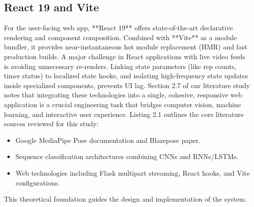 \subsection{React 19 and Vite}
For the user-facing web app, **React 19** offers state-of-the-art declarative rendering and component composition. Combined with **Vite** as a module bundler, it provides near-instantaneous hot module replacement (HMR) and fast production builds. A major challenge in React applications with live video feeds is avoiding unnecessary re-renders. Linking state parameters (like rep counts, timer status) to localized state hooks, and isolating high-frequency state updates inside specialized components, prevents UI lag.
Section 2.7 of our literature study notes that integrating these technologies into a single, cohesive, responsive web application is a crucial engineering task that bridges computer vision, machine learning, and interactive user experience.
Listing 2.1 outlines the core literature sources reviewed for this study:
\begin{itemize}
    \item Google MediaPipe Pose documentation and Blazepose paper.
    \item Sequence classification architectures combining CNNs and RNNs/LSTMs.
    \item Web technologies including Flask multipart streaming, React hooks, and Vite configurations.
\end{itemize}
This theoretical foundation guides the design and implementation of the system.
\newpage
